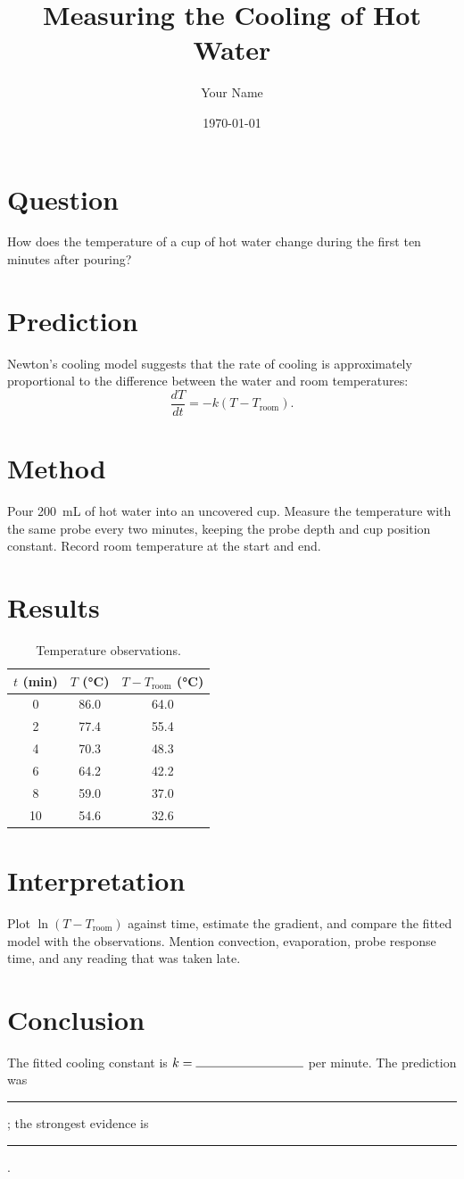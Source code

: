 \documentclass[11pt]{article}
\title{Measuring the Cooling of Hot Water}
\author{Your Name}
\date{\today}
\begin{document}
\maketitle
\section{Question}
How does the temperature of a cup of hot water change during the first ten
minutes after pouring?

\section{Prediction}
Newton's cooling model suggests that the rate of cooling is approximately
proportional to the difference between the water and room temperatures:
\[
  \frac{dT}{dt}=-k(T-T_\mathrm{room}).
\]

\section{Method}
Pour \SI{200}{mL} of hot water into an uncovered cup. Measure the temperature
with the same probe every two minutes, keeping the probe depth and cup position
constant. Record room temperature at the start and end.

\section{Results}
\begin{table}[ht]
\centering
\caption{Temperature observations.}
\begin{tabular}{@{}S[table-format=2.0] S[table-format=2.1] S[table-format=2.1]@{}}
\toprule
{$t$ (min)} & {$T$ (\si{\celsius})} & {$T-T_\mathrm{room}$ (\si{\celsius})}\\
 & 86.0 & 64.0\\
2 & 77.4 & 55.4\\
4 & 70.3 & 48.3\\
6 & 64.2 & 42.2\\
8 & 59.0 & 37.0\\
10 & 54.6 & 32.6\\
\bottomrule
\end{tabular}
\end{table}

\section{Interpretation}
Plot $\ln(T-T_\mathrm{room})$ against time, estimate the gradient, and compare
the fitted model with the observations. Mention convection, evaporation, probe
response time, and any reading that was taken late.

\section{Conclusion}
The fitted cooling constant is $k=\rule{0.25\linewidth}{0.4pt}$ per minute.
The prediction was \rule{0.2\linewidth}{0.4pt}; the strongest evidence is
\rule{0.4\linewidth}{0.4pt}.
\end{document}
